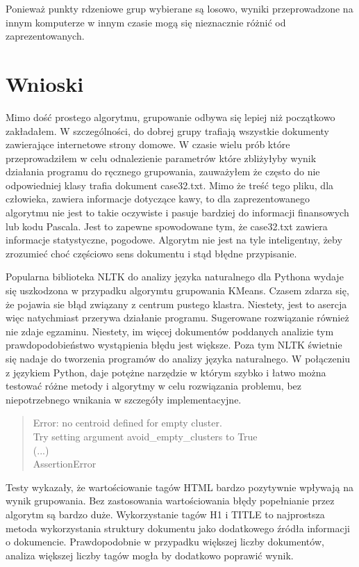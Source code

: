 \documentclass{article}
\begin{document}
Ponieważ punkty rdzeniowe grup wybierane są losowo, wyniki przeprowadzone na innym komputerze w innym czasie mogą się nieznacznie różnić od zaprezentowanych.

\section{Wnioski}
Mimo dość prostego algorytmu, grupowanie odbywa się lepiej niż początkowo zakładałem. W szczególności, do dobrej grupy trafiają wszystkie dokumenty zawierające internetowe strony domowe. W czasie wielu prób które przeprowadziłem w celu odnalezienie parametrów które zbliżyłyby wynik działania programu do ręcznego grupowania, zauważyłem że często do nie odpowiedniej klasy trafia dokument case32.txt. Mimo że treść tego pliku, dla człowieka, zawiera informacje dotyczące kawy, to dla zaprezentowanego algorytmu nie jest to takie oczywiste i pasuje bardziej do informacji finansowych lub kodu Pascala. Jest to zapewne spowodowane tym, że case32.txt zawiera informacje statystyczne, pogodowe. Algorytm nie jest na tyle inteligentny, żeby zrozumieć choć częściowo sens dokumentu i stąd błędne przypisanie.

Popularna biblioteka NLTK do analizy języka naturalnego dla Pythona wydaje się uszkodzona w przypadku algorymtu grupowania KMeans. Czasem zdarza się, że pojawia sie błąd związany z centrum pustego klastra. Niestety, jest to asercja więc natychmiast przerywa działanie programu. Sugerowane rozwiązanie również nie zdaje egzaminu. Niestety, im więcej dokumentów poddanych analizie tym prawdopodobieństwo wystąpienia błędu jest większe. Poza tym NLTK świetnie się nadaje do tworzenia programów do analizy języka naturalnego. W połączeniu z językiem Python, daje potężne narzędzie w którym szybko i łatwo można testować różne metody i algorytmy w celu rozwiązania problemu, bez niepotrzebnego wnikania w szczegóły implementacyjne.
\begin{quotation}
Error: no centroid defined for empty cluster. \\
Try setting argument avoid\_empty\_clusters to True \\
(...) \\
AssertionError
\end{quotation}

Testy wykazały, że wartościowanie tagów HTML bardzo pozytywnie wpływają na wynik grupowania. Bez zastosowania wartościowania błędy popełnianie przez algorytm są bardzo duże. Wykorzystanie tagów H1 i TITLE to najprostsza metoda wykorzystania struktury dokumentu jako dodatkowego źródła informacji o dokumencie. Prawdopodobnie w przypadku większej liczby dokumentów, analiza większej liczby tagów mogła by dodatkowo poprawić wynik.
\end{document}
